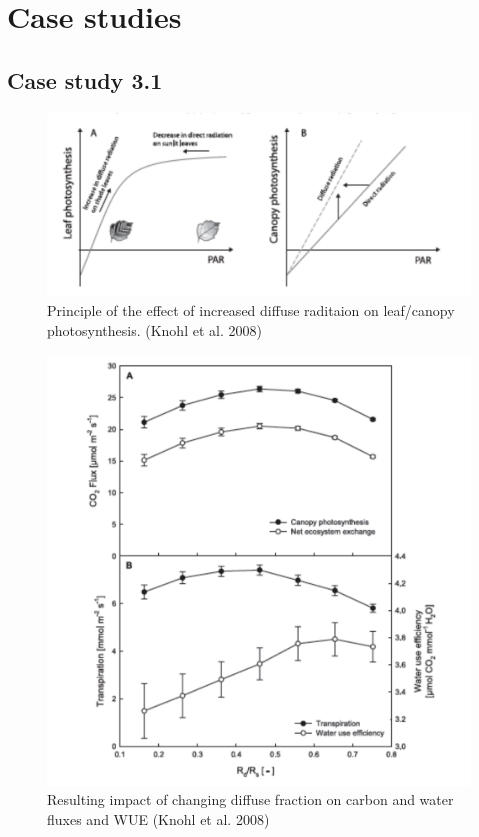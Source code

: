 \documentclass[12pt,oneside]{book}
\begin{document}
\section{Case studies}\label{case-studies-1}

\subsection{Case study 3.1}\label{case-study-3.1}

\begin{figure}

{\centering \includegraphics[width=0.8\linewidth]{figures/chap3/f332_knohl1} 

}

\caption{Principle of the effect of increased diffuse raditaion on leaf/canopy photosynthesis. (Knohl et al. 2008)}\label{fig:f332}
\end{figure}

\begin{figure}

{\centering \includegraphics[width=0.8\linewidth]{figures/chap3/f333_knohl2} 

}

\caption{Resulting impact of changing diffuse fraction on carbon and water fluxes and WUE (Knohl et al. 2008)}\label{fig:f333}
\end{figure}
\end{document}
